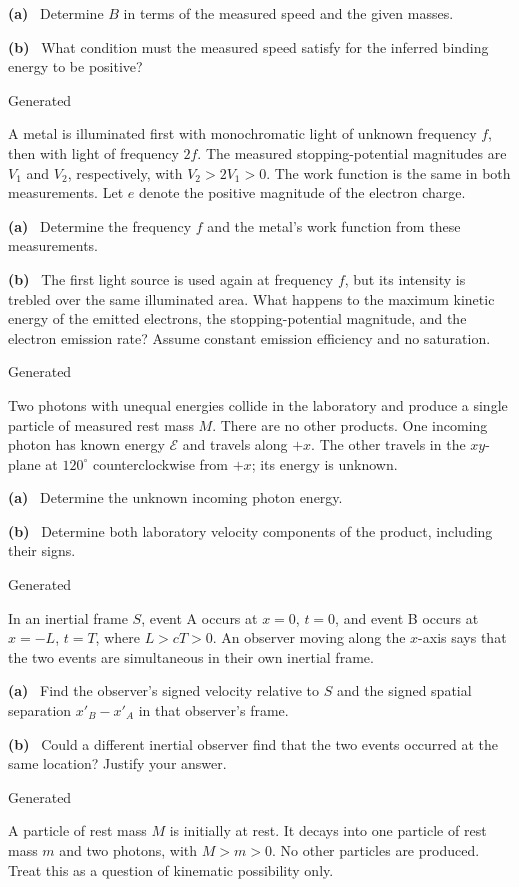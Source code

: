 \documentclass[12pt,letterpaper]{article}
\newcommand{\question}[1]{\noindent{\large\bfseries #1.}\hfill{\small Generated}\par\medskip}
\newcommand{\partlabel}[1]{\noindent\textbf{(#1)}\ }
\begin{document}
\partlabel{a} Determine $B$ in terms of the measured speed and the given masses.
\vfill

\partlabel{b} What condition must the measured speed satisfy for the inferred
binding energy to be positive?
\vfill
\newpage

\question{2}
A metal is illuminated first with monochromatic light of unknown frequency $f$,
then with light of frequency $2f$. The measured stopping-potential magnitudes
are $V_1$ and $V_2$, respectively, with $V_2>2V_1>0$.
The work function is the same in both measurements. Let $e$ denote the positive
magnitude of the electron charge.

\partlabel{a} Determine the frequency $f$ and the metal's work function from
these measurements.
\vfill

\partlabel{b} The first light source is used again at frequency $f$, but its
intensity is trebled over the same illuminated area. What happens to the maximum
kinetic energy of the emitted electrons, the stopping-potential magnitude, and
the electron emission rate? Assume constant emission efficiency and no saturation.
\vfill
\newpage

\question{3}
Two photons with unequal energies collide in the laboratory and produce a
single particle of measured rest mass $M$. There are no other products.
One incoming photon has known energy $\mathcal E$ and travels along $+x$.
The other travels in the $xy$-plane at $120^\circ$ counterclockwise from $+x$;
its energy is unknown.

\partlabel{a} Determine the unknown incoming photon energy.
\vfill

\partlabel{b} Determine both laboratory velocity components of the product,
including their signs.
\vfill
\newpage

\question{4}
In an inertial frame $S$, event A occurs at $x=0$, $t=0$, and event B occurs at
$x=-L$, $t=T$, where $L>cT>0$. An observer moving along the $x$-axis says that
the two events are simultaneous in their own inertial frame.

\partlabel{a} Find the observer's signed velocity relative to $S$ and the signed
spatial separation $x'_B-x'_A$ in that observer's frame.
\vfill

\partlabel{b} Could a different inertial observer find that the two events
occurred at the same location? Justify your answer.
\vfill
\newpage

\question{5}
A particle of rest mass $M$ is initially at rest. It decays into one particle of
rest mass $m$ and two photons, with $M>m>0$. No other particles are produced.
Treat this as a question of kinematic possibility only.
\end{document}

